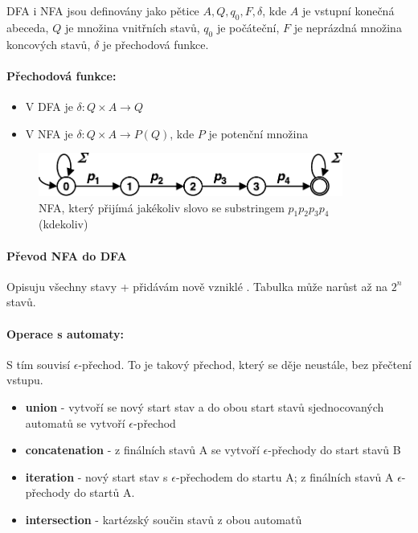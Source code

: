 DFA i NFA jsou definovány jako pětice ${A, Q, q_0, F, \delta}$, kde $A$ je vstupní konečná abeceda, $Q$ je množina vnitřních stavů, $q_0$ je počáteční, $F$ je neprázdná množina koncových stavů, $\delta$ je přechodová funkce.

\paragraph{Přechodová funkce:}
\begin{itemize}
\item V DFA je $\delta : Q \times A \rightarrow Q$
\item V NFA je $\delta : Q \times A \rightarrow P(Q)$, kde $P$ je potenční množina
\end{itemize}

\begin{figure}[h]
    \begin{center}
        \includegraphics[width=100mm]{spolecne/04/images/automat-hledani}
    \end{center}
    \caption{NFA, který přijímá jakékoliv slovo se substringem $p_1p_2p_3p_4$ (kdekoliv)}
\end{figure}

\paragraph{Převod NFA do DFA} Opisuju všechny stavy + přidávám nově vzniklé . Tabulka může narůst až na $2^n$ stavů.

\paragraph{Operace s automaty:} S tím souvisí $\epsilon$-přechod. To je takový přechod, který se děje neustále, bez přečtení vstupu.
\begin{itemize}
\item \textbf{union} - vytvoří se nový start stav a do obou start stavů sjednocovaných automatů se vytvoří $\epsilon$-přechod
\item \textbf{concatenation} - z finálních stavů A se vytvoří $\epsilon$-přechody do start stavů B
\item \textbf{iteration} - nový start stav s $\epsilon$-přechodem do startu A; z finálních stavů A $\epsilon$-přechody do startů A.
\item \textbf{intersection} - kartézský součin stavů z obou automatů
\end{itemize}

